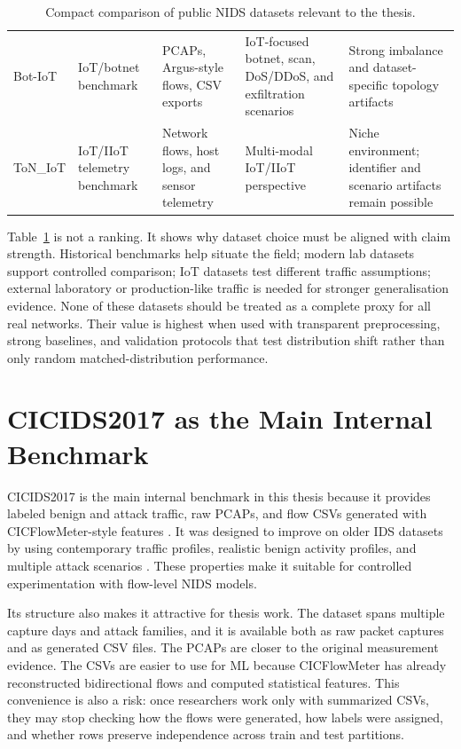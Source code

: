 \begin{table}[htbp]
\begin{tabular}{p{1.85cm}p{1.9cm}p{2.45cm}p{2.65cm}p{2.8cm}}
Bot-IoT & IoT/botnet benchmark & PCAPs, Argus-style flows, CSV exports & IoT-focused botnet, scan, DoS/DDoS, and exfiltration scenarios \parencite{Koroniotis2019BotIoT} & Strong imbalance and dataset-specific topology artifacts \\
ToN\_IoT & IoT/IIoT telemetry benchmark & Network flows, host logs, and sensor telemetry & Multi-modal IoT/IIoT perspective \parencite{Alsaedi2020ToNIoT} & Niche environment; identifier and scenario artifacts remain possible \\
\bottomrule
\end{tabular}
\caption{Compact comparison of public NIDS datasets relevant to the thesis.}
\label{tab:nids-datasets}
\end{table}

Table~\ref{tab:nids-datasets} is not a ranking. It shows why dataset choice must be aligned with claim strength. Historical benchmarks help situate the field; modern lab datasets support controlled comparison; IoT datasets test different traffic assumptions; external laboratory or production-like traffic is needed for stronger generalisation evidence. None of these datasets should be treated as a complete proxy for all real networks. Their value is highest when used with transparent preprocessing, strong baselines, and validation protocols that test distribution shift rather than only random matched-distribution performance.

\section{CICIDS2017 as the Main Internal Benchmark}

CICIDS2017 is the main internal benchmark in this thesis because it provides labeled benign and attack traffic, raw PCAPs, and flow CSVs generated with CICFlowMeter-style features \parencite{Sharafaldin2018CICIDS2017,Lashkari2017CICFlowMeter,CICIDS2017Web}. It was designed to improve on older IDS datasets by using contemporary traffic profiles, realistic benign activity profiles, and multiple attack scenarios \parencite{Sharafaldin2018CICIDS2017,Sharafaldin2019Detailed}. These properties make it suitable for controlled experimentation with flow-level NIDS models.

Its structure also makes it attractive for thesis work. The dataset spans multiple capture days and attack families, and it is available both as raw packet captures and as generated CSV files. The PCAPs are closer to the original measurement evidence. The CSVs are easier to use for ML because CICFlowMeter has already reconstructed bidirectional flows and computed statistical features. This convenience is also a risk: once researchers work only with summarized CSVs, they may stop checking how the flows were generated, how labels were assigned, and whether rows preserve independence across train and test partitions.

